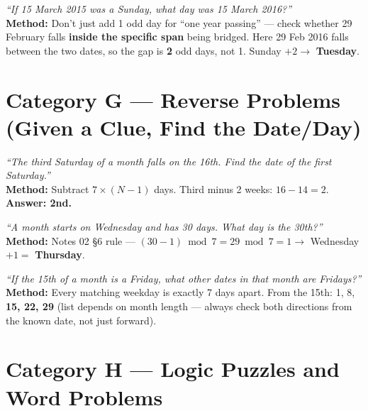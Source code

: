 \documentclass[11pt]{article}
\begin{document}
\begin{examplebox}
\emph{``If 15 March 2015 was a Sunday, what day was 15 March 2016?''} \\
\textbf{Method:} Don't just add 1 odd day for ``one year passing'' --- check whether 29 February
falls \textbf{inside the specific span} being bridged. Here 29 Feb 2016 falls between the two dates,
so the gap is \textbf{2} odd days, not 1. Sunday $+2 \to$ \textbf{Tuesday}.
\end{examplebox}

\section{Category G --- Reverse Problems (Given a Clue, Find the Date/Day)}

\begin{examplebox}
\emph{``The third Saturday of a month falls on the 16th. Find the date of the first Saturday.''} \\
\textbf{Method:} Subtract $7\times(N-1)$ days. Third minus 2 weeks: $16-14=2$. \textbf{Answer: 2nd.}
\end{examplebox}

\begin{examplebox}
\emph{``A month starts on Wednesday and has 30 days. What day is the 30th?''} \\
\textbf{Method:} Notes 02 \S6 rule --- $(30-1) \bmod 7 = 29 \bmod 7 = 1 \to$ Wednesday $+1 = $
\textbf{Thursday}.
\end{examplebox}

\begin{examplebox}
\emph{``If the 15th of a month is a Friday, what other dates in that month are Fridays?''} \\
\textbf{Method:} Every matching weekday is exactly 7 days apart. From the 15th: 1, 8,
\textbf{15, 22, 29} (list depends on month length --- always check both directions from the known
date, not just forward).
\end{examplebox}

\section{Category H --- Logic Puzzles and Word Problems}
\end{document}
